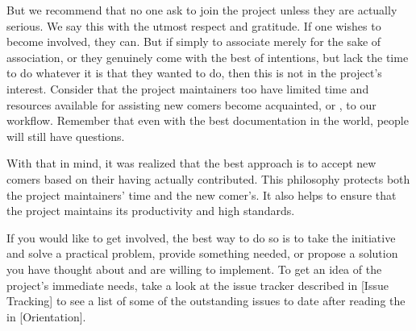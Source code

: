 But we recommend that no one ask to join the project unless they are actually serious. We say this with the utmost respect and gratitude. If one wishes to become involved, they can. But if simply to associate merely for the sake of association, or they genuinely come with the best of intentions, but lack the time to do whatever it is that they wanted to do, then this is not in the project's interest. Consider that the project maintainers too have limited time and resources available for assisting new comers become acquainted, or , to our workflow. Remember that even with the best documentation in the world, people will still have questions.

With that in mind, it was realized that the best approach is to accept new comers based on their having actually contributed. This philosophy protects both the project maintainers' time and the new comer's. It also helps to ensure that the project maintains its productivity and high standards. 

If you would like to get involved, the best way to do so is to take the initiative and solve a practical problem, provide something needed, or propose a solution you have thought about and are willing to implement. To get an idea of the project's immediate needs, take a look at the issue tracker described in [Issue Tracking] to see a list of some of the outstanding issues to date after reading the \about[Orientation] in [Orientation].

